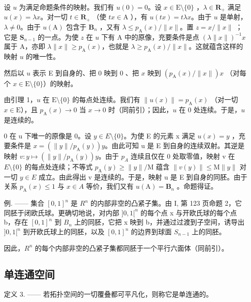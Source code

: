设 \(u\) 为满足命题条件的映射。我们有 \(u(0) = 0\)。设 \(x \in \mathrm{E}\setminus\{0\}\) ，\(\lambda \in \mathbf{R}_+\) 满足 \(u(x) = \lambda x\)。对一切 \(t \in \mathbf{R}_+\) （使 \(tx \in \mathrm{A}\) ），有 \(u(tx) = t\lambda x\)。由于 \(u\) 是单射，\(\lambda \neq 0\)。由于 \(u(\mathrm{A})\) 包含于 \(\mathbf{B}_n\) ，又有 \(\lambda \leqslant p_{\mathrm{A}}(x)/\|x\|\)。置 \(z = x/\|x\|\) ；它是 \(\mathbf{S}_{n-1}\) 的一点。为使 \(z\) 在 \(u\) 下有 A 中的原像，充要条件是点 \((\lambda \|x\|)^{-1}x\) 属于 A，亦即 \(\lambda \|x\| \geqslant p_{\mathrm{A}}(x)\)，也就是 \(\lambda \geqslant p_{\mathrm{A}}(x)/\|x\|\)。这就蕴含这样的映射 \(u\) 的唯一性。

然后以 \(u\) 表示 E 到自身的、把 0 映到 0 、把 \(x\) 映到 \((p_{\mathrm{A}}(x) / \| x\|)x\) （对每个 \(x \in \mathrm{E}\setminus\{0\}\)）的映射。

由引理 1，\(u\) 在 \(\mathrm{E}\setminus\{0\}\) 的每点处连续。我们有 \(\| u(x)\| = p_{\mathrm{A}}(x)\) （对一切 \(x\in \mathrm{E}\)），且 \(p_{\mathrm{A}}(x)\to 0\) 当 \(x\to 0\) 时（同前引）；因此，\(u\) 在 0 处连续。于是，\(u\) 是连续的。

0 在 u 下唯一的原像是 0。设 \(y \in E\setminus\{0\}\)。为使 E 的元素 x 满足 \(u(x) = y\) ，充要条件是 \(x = (\|y\| / p_{\mathrm{A}}(y))y\)。由此可知 u 是 E 到自身的连续双射。其逆是映射 \(v: y \mapsto (\|y\| / p_{\mathrm{A}}(y))y\)。由于 \(p_{A}\) 连续且仅在 0 处取零值，映射 v 在 \(E\setminus\{0\}\) 的每点处连续；不等式 \(p_{\mathrm{A}}(y) \geqslant \|y\| / \mathrm{M}\) 蕴含 \(\|v(y)\| \leqslant \mathrm{M}\|y\|\) 对一切 \(y \in E\) 成立。由此得出 v 是连续的。于是，映射 u 是 E 到自身的同胚。由于关系 \(p_{\mathrm{A}}(x) \leqslant 1\) 与 \(x \in A\) 等价，我们又有 \(u(\mathrm{A}) = \mathbf{B}_{n}\) 。命题得证。

例. —— 集合 \([0,1]^{n}\) 是 \(R^{n}\) 的内部非空的凸紧子集。由 I, 第 123 页命题 2，它同胚于闭欧氏球。更确切地说，对内部 \(]0,1[^{n}\) 的每个点 x 与开欧氏球的每个点 b，存在 \([0,1]^{n}\) 到 \(B_{n}\) 上的同胚，它把 x 映到 b，并通过过渡到子空间，诱导出 \(]0,1[^{n}\) 到开欧氏球上的同胚，以及 \([0,1]^{n}\) 的边界到球面 \(S_{n-1}\) 上的同胚。

因此，\(R^{n}\) 的每个内部非空的凸紧子集都同胚于一个平行六面体（同前引）。

\subsection{单连通空间}

定义 3. —— 若拓扑空间的一切覆叠都可平凡化，则称它是单连通的。

